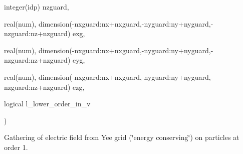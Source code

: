 {\begin{DoxyParamCaption}
\item[{integer(idp)}]{nzguard, }
\item[{real(num), dimension(-\/nxguard\+:nx+nxguard,-\/nyguard\+:ny+nyguard,-\/nzguard\+:nz+nzguard)}]{exg, }
\item[{real(num), dimension(-\/nxguard\+:nx+nxguard,-\/nyguard\+:ny+nyguard,-\/nzguard\+:nz+nzguard)}]{eyg, }
\item[{real(num), dimension(-\/nxguard\+:nx+nxguard,-\/nyguard\+:ny+nyguard,-\/nzguard\+:nz+nzguard)}]{ezg, }
\item[{logical}]{l\+\_\+lower\+\_\+order\+\_\+in\+\_\+v}
\end{DoxyParamCaption}
)}\hypertarget{field__gathering__3d__o1_8_f90_a573c1601d8884aa699121b456d176757}{}\label{field__gathering__3d__o1_8_f90_a573c1601d8884aa699121b456d176757}


Gathering of electric field from Yee grid (\char`\"{}energy conserving\char`\"{}) on particles at order 1. 

